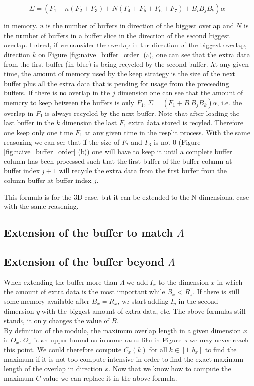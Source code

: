 \documentclass[conference]{IEEEtran}
\begin{document}
$$\Sigma = (F_1 + n(F_2 + F_3) + N(F_4 + F_5 + F_6 + F_7) + B_iB_jB_k)\alpha$$

in memory.
$n$ is the number of buffers in direction of the biggest overlap and $N$ is the number of buffers in a buffer slice in the direction of the second biggest overlap.
Indeed, if we consider the overlap in the direction of the biggest overlap, direction $k$ on Figure \ref{fig:naive_buffer_order} (a), one can see that the extra data from the first buffer (in blue) is being recycled by the second buffer.
At any given time, the amount of memory used by the keep strategy is the size of the next buffer plus all the extra data that is pending for usage from the preceeding buffers.
If there is no overlap in the $j$ dimension one can see that the amount of memory to keep between the buffers is only $F_1$,
$\Sigma = (F_1 + B_iB_jB_k)\alpha$,
i.e. the overlap in $F_1$ is always recycled by the next buffer.
Note that after loading the last buffer in the $k$ dimension the last $F_1$ extra data stored is recyled.
Therefore one keep only one time $F_1$ at any given time in the resplit process.
With the same reasoning we can see that if the size of $F_2$ and $F_3$ is not 0 (Figure \ref{fig:naive_buffer_order} (b)) one will have to keep it until a complete buffer column has been processed such that the first buffer of the buffer column at buffer index $j+1$ will recycle the extra data from the first buffer from the column buffer at buffer index $j$.

This formula is for the 3D case, but it can be extended to the N dimensional case with the same reasoning.

\subsection{Extension of the buffer to match $\Lambda$}
\subsection{Extension of the buffer beyond $\Lambda$}
When extending the buffer more than $\Lambda$ we add $I_x$ to the dimension $x$ in which the amount of extra data is the most important while $B_x < R_x$.
If there is still some memory available after $B_x=R_x$, we start adding $I_y$ in the second dimension $y$ with the biggest amount of extra data, etc.
The above formulas still stands, it only changes the value of $B$. \\

By definition of the modulo, the maximum overlap length in a given dimension $x$ is $O_x$.
$O_x$ is an upper bound as in some cases like in Figure x we may never reach this point.
We could therefore compute $C_x(k)$ for all $k \in [1, b_x]$ to find the maximum if it is not too compute intensive in order to find the exact maximum length of the overlap in direction $x$. Now that we know how to compute the maximum $C$ value we can replace it in the above formula.
\end{document}

